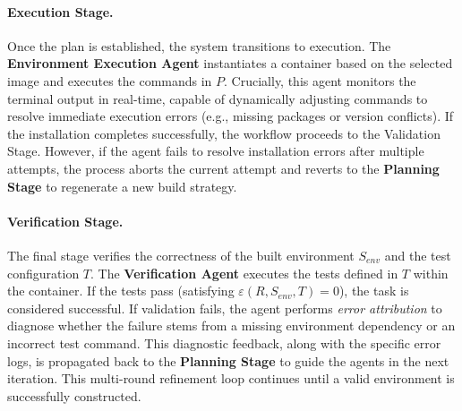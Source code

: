 \documentclass{article}
\theoremstyle{plain}
\theoremstyle{definition}
\theoremstyle{remark}
\begin{document}
\paragraph{Execution Stage.}
Once the plan is established, the system transitions to execution. 
The \textbf{Environment Execution Agent} instantiates a container based on the selected image and executes the commands in $P$. 
Crucially, this agent monitors the terminal output in real-time, capable of dynamically adjusting commands to resolve immediate execution errors (e.g., missing packages or version conflicts). 
If the installation completes successfully, the workflow proceeds to the Validation Stage. 
However, if the agent fails to resolve installation errors after multiple attempts, the process aborts the current attempt and reverts to the \textbf{Planning Stage} to regenerate a new build strategy.

\paragraph{Verification Stage.}
The final stage verifies the correctness of the built environment $S_{env}$ and the test configuration $T$. 
The \textbf{Verification Agent} executes the tests defined in $T$ within the container. 
If the tests pass (satisfying $\varepsilon(R, S_{env}, T) = 0$), the task is considered successful. 
If validation fails, the agent performs \textit{error attribution} to diagnose whether the failure stems from a missing environment dependency or an incorrect test command. 
This diagnostic feedback, along with the specific error logs, is propagated back to the \textbf{Planning Stage} to guide the agents in the next iteration. This multi-round refinement loop continues until a valid environment is successfully constructed.

    
    
    
\end{document}
